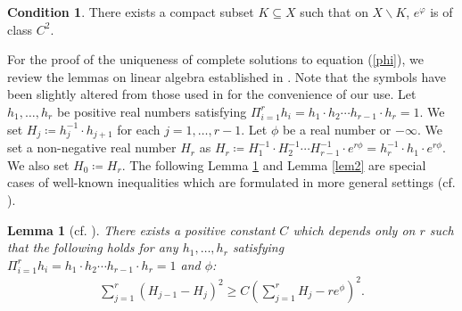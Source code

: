\documentclass[12pt]{article}
\theoremstyle{definition}
\newtheorem{lemm}[defi]{Lemma}
\newtheorem{cond}[defi]{Condition}
\begin{document}
\begin{cond}\label{condition} There exists a compact subset $K\subseteq X$ such that on $X\backslash K$, $e^{\varphi}$ is of class $C^2$.
\end{cond} 
For the proof of the uniqueness of complete solutions to equation (\ref{phi}), we review the lemmas on linear algebra established in \cite[Section 3.2]{LM1}. Note that the symbols have been slightly altered from those used in \cite{LM1} for the convenience of our use. Let $h_1,\dots, h_r$ be positive real numbers satisfying $\Pi_{i=1}^r h_i=h_1\cdot h_2\cdots h_{r-1}\cdot h_r=1$. We set $H_j\coloneqq h_j^{-1}\cdot h_{j+1}$ for each $j=1,\dots, r-1$. Let $\phi$ be a real number or $-\infty$. We set a non-negative real number $H_r$ as $H_r\coloneqq H_1^{-1}\cdot H_2^{-1}\cdots H_{r-1}^{-1}\cdot e^{r\phi}=h_r^{-1}\cdot h_1\cdot e^{r\phi}$. We also set $H_0\coloneqq H_r$. The following Lemma \ref{lem1} and Lemma \ref{lem2} are special cases of well-known inequalities which are formulated in more general settings (cf. \cite{LM1, Sim2}).
\begin{lemm}[cf. \cite{LM1, Sim2}]\label{lem1}{\it There exists a positive constant $C$ which depends only on $r$ such that the following holds for any $h_1,\dots, h_r$ satisfying $\Pi_{i=1}^r h_i=h_1\cdot h_2\cdots h_{r-1}\cdot h_r=1$ and $\phi$:
\begin{align}
\sum_{j=1}^r(H_{j-1}-H_j)^2\geq C(\sum_{j=1}^rH_j-re^\phi)^2. \label{ephi1}
\end{align}
}
\end{lemm}
\end{document}
